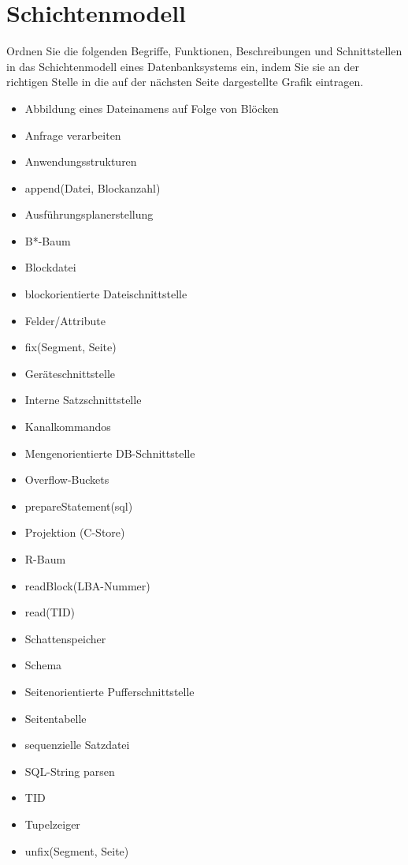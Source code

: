 \section{Schichtenmodell}

Ordnen Sie die folgenden Begriffe, Funktionen, Beschreibungen und Schnittstellen in das Schichtenmodell eines Datenbanksystems ein, indem Sie sie an der richtigen Stelle in die auf der nächsten Seite dargestellte Grafik eintragen.

\cprotEnv
\begin{normalText}
\begin{minipage}[t]{0.49\textwidth}
\begin{itemize}\setlength\itemsep{0em}
    \item Abbildung eines Dateinamens auf Folge von Blöcken
    \item Anfrage verarbeiten
    \item Anwendungsstrukturen
    \item append(Datei, Blockanzahl)
    \item Ausführungsplanerstellung
    \item B*-Baum
    \item Blockdatei
    \item blockorientierte Dateischnittstelle
    \item Felder/Attribute
    \item fix(Segment, Seite)
    \item Geräteschnittstelle
    \item Interne Satzschnittstelle
    \item Kanalkommandos
    \item Mengenorientierte DB-Schnittstelle
\end{itemize}
\end{minipage}
\begin{minipage}[t]{0.49\textwidth}
\begin{itemize}\setlength\itemsep{0em}
    \item Overflow-Buckets
    \item prepareStatement(sql)
    \item Projektion (C-Store)
    \item R-Baum
    \item readBlock(LBA-Nummer)
    \item read(TID)
    \item Schattenspeicher
    \item Schema
    \item Seitenorientierte Pufferschnittstelle
    \item Seitentabelle
    \item sequenzielle Satzdatei
    \item SQL-String parsen
    \item TID
    \item Tupelzeiger
    \item unfix(Segment, Seite)
\end{itemize}
\end{minipage}



\end{normalText}
